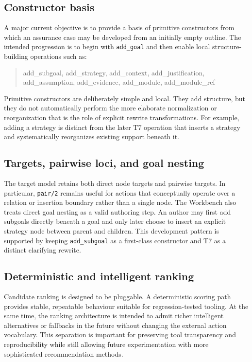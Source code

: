 \documentclass[12pt,twoside,a4paper]{article}
\begin{document}
\subsection{Constructor basis}

A major current objective is to provide a basis of primitive constructors from which an assurance case may be developed from an initially empty outline.
The intended progression is to begin with \texttt{add\_goal} and then enable local structure-building operations such as:
\begin{quote}\ttfamily
add\_subgoal, add\_strategy, add\_context, add\_justification,\\
add\_assumption, add\_evidence, add\_module, add\_module\_ref
\end{quote}
Primitive constructors are deliberately simple and local.
They add structure, but they do not automatically perform the more elaborate normalization or reorganization that is the role of explicit rewrite transformations.
For example, adding a strategy is distinct from the later T7 operation that inserts a strategy and systematically reorganizes existing support beneath it.

\subsection{Targets, pairwise loci, and goal nesting}

The target model retains both direct node targets and pairwise targets.
In particular, \texttt{pair/2} remains useful for actions that conceptually operate over a relation or insertion boundary rather than a single node.
The Workbench also treats direct goal nesting as a valid authoring step.
An author may first add subgoals directly beneath a goal and only later choose to insert an explicit strategy node between parent and children.
This development pattern is supported by keeping \texttt{add\_subgoal} as a first-class constructor and T7 as a distinct clarifying rewrite.

\subsection{Deterministic and intelligent ranking}

Candidate ranking is designed to be pluggable.
A deterministic scoring path provides stable, repeatable behaviour suitable for regression-tested tooling.
At the same time, the ranking architecture is intended to admit richer intelligent alternatives or fallbacks in the future without changing the external action vocabulary.
This separation is important for preserving tool transparency and reproducibility while still allowing future experimentation with more sophisticated recommendation methods.
\end{document}
